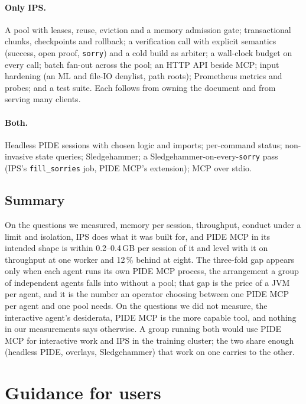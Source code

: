 \documentclass[11pt]{article}
\newcommand{\code}[1]{\colorbox{gray!12}{\texttt{\vphantom{Ag}#1}}}
\begin{document}
\paragraph{Only IPS.} A pool with leases, reuse, eviction and a memory
admission gate; transactional chunks, checkpoints and rollback; a
verification call with explicit semantics (success, open proof,
\code{sorry}) and a cold build as arbiter; a wall-clock budget on every
call; batch fan-out across the pool; an HTTP API beside MCP; input
hardening (an ML and file-IO denylist, path roots); Prometheus metrics
and probes; and a test suite. Each follows from owning the document and
from serving many clients.

\paragraph{Both.} Headless PIDE sessions with chosen logic and imports;
per-command status; non-invasive state queries; Sledgehammer; a
Sledgehammer-on-every-\code{sorry} pass (IPS's \code{fill\_sorries} job,
PIDE MCP's extension); MCP over stdio.

\subsection{Summary}

On the questions we measured, memory per session, throughput, conduct
under a limit and isolation, IPS does what it was built for, and PIDE
MCP in its intended shape is within 0.2--0.4\,GB per session of it and
level with it on throughput at one worker and 12\,\% behind at eight. The three-fold
gap appears only when each agent runs its own PIDE MCP process, the
arrangement a group of independent agents falls into without a pool; that
gap is the price of a JVM per agent, and it is the number an operator
choosing between one PIDE MCP per agent and one pool needs. On the
questions we did not measure, the interactive agent's desiderata, PIDE MCP
is the more capable tool, and nothing in our measurements says otherwise.
A group running both would use PIDE MCP for interactive work and IPS in
the training cluster; the two share enough (headless PIDE, overlays,
Sledgehammer) that work on one carries to the other.

\section{Guidance for users}
\label{sec:guidance}
\end{document}
